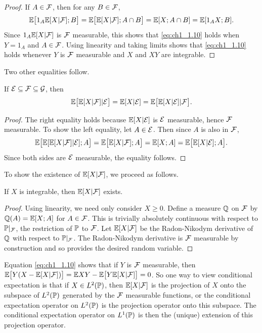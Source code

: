 \begin{proof}
If $A \in \FC$, then for any $B \in \FC$,
\[
    \E\big[1_A\E[X\mid \FC];B\big] = \E\big[\E[X\mid \FC];A \cap B\big] = \E[X;A \cap B] = \E[1_AX;B].
\]
Since $1_A\E[X\mid \FC]$ is $\FC$ measurable, this shows that \eqref{eq:ch1_1.10} holds when $Y = 1_A$ and $A \in \FC$. Using linearity and taking limits shows that \eqref{eq:ch1_1.10} holds whenever $Y$ is $\FC$ measurable and $X$ and $XY$ are integrable.
\end{proof}

Two other equalities follow.

\begin{proposition}\label{prop:ch1_1.13}
If $\EC \subseteq \FC \subseteq \GC$, then
\begin{equation}\label{eq:ch1_1.11}
    \E\big[\E[X\mid \FC]\mid \EC\big] = \E[X\mid \EC] = \E\big[\E[X\mid \EC]\mid \FC\big].
\end{equation}
\end{proposition}

\begin{proof}
The right equality holds because $\E[X\mid \EC]$ is $\EC$ measurable, hence $\FC$ measurable. To show the left equality, let $A \in \EC$. Then since $A$ is also in $\FC$,
\[
    \E\big[\E[\E[X\mid \FC]\mid \EC];A\big] = \E\big[\E[X\mid \FC];A\big] = \E[X;A] = \E\big[\E[X\mid \EC];A\big].
\]
Since both sides are $\EC$ measurable, the equality follows.
\end{proof}

To show the existence of $\E[X\mid \FC]$, we proceed as follows.

\begin{proposition}\label{prop:ch1_1.14}
If $X$ is integrable, then $\E[X\mid \FC]$ exists.
\end{proposition}

\begin{proof}
Using linearity, we need only consider $X \geq 0$. Define a measure $\Q$ on $\FC$ by $\Q(A) = \E[X;A]$ for $A \in \FC$. This is trivially absolutely continuous with respect to $\P|_\FC$, the restriction of $\P$ to $\FC$. Let $\E[X\mid \FC]$ be the Radon-Nikodym derivative of $\Q$ with respect to $\P|_\FC$. The Radon-Nikodym derivative is $\FC$ measurable by construction and so provides the desired random variable.
\end{proof}

Equation \eqref{eq:ch1_1.10} shows that if $Y$ is $\FC$ measurable, then $\E\big[Y(X - \E[X\mid \FC])\big] = \E XY - \E\big[Y\E[X\mid \FC]\big] = 0$. So one way to view conditional expectation is that if $X \in L^2(\P)$, then $\E[X\mid \FC]$ is the projection of $X$ onto the subspace of $L^2(\P)$ generated by the $\FC$ measurable functions, or the conditional expectation operator on $L^2(\P)$ is the projection operator onto this subspace. The conditional expectation operator on $L^1(\P)$ is then the (unique) extension of this projection operator.

